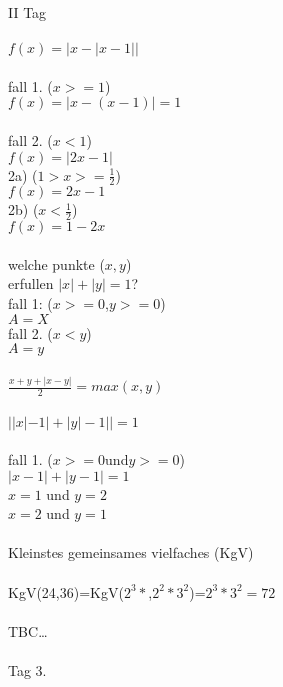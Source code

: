 \documentclass[a4paper,12pt]{article}
\begin{document}
\pagestyle{headings}

II Tag\\
\\
$f(x)=|x-|x-1||$
\\
\\fall 1. ($x>=1$)
\\
$f(x)=|x-(x-1)|=1$
\\
\\fall 2. ($x<1$)
\\$f(x)=|2x-1|$
\\2a) ($1>x>=\frac{1}{2}$)
\\$f(x)=2x-1$
\\2b) ($x<\frac{1}{2}$)
\\$f(x)=1-2x$
\\
\\welche punkte ($x,y$)
\\erfullen $|x|+|y|=1$?
\\fall 1: ($x>=0$,$y>=0$) 
\\$A=X$
\\fall 2. ($x<y$)
\\$A=y$
\\
\\$\frac{x+y+|x-y|}{2}=max(x,y)$
\\
\\$||x|-1|+|y|-1||=1$
\\
\\fall 1. ($x>=0$und$y>=0$)
\\$|x-1|+|y-1|=1$
\\$x=1$ und $y=2$
\\$x=2$ und $y=1$
\\
\\Kleinstes gemeinsames vielfaches (KgV)
\\
\\KgV(24,36)=KgV($2^3*$,$2^2*3^2$)=$2^3*3^2=72$
\\
\\TBC\dots
\\
\\Tag 3.
\\
\\
\end{document}
